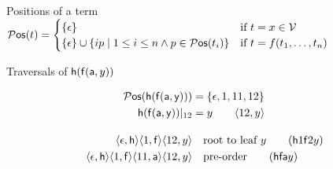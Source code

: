 

\begin{exampleblock}{Positions of a term}
$
	{}{\mathcal P}\mathsf{os}(t) =  
	\begin{cases}
		\{ \epsilon \} & \text{if }t=x\in{\mathcal V} \\
		\{ \epsilon \} \cup \{ ip\mid 1\leq i\leq n \land p\in{}{\mathcal P}\mathsf{os}(t_i)\} &
		\text{if }t=f(t_1,\ldots,t_n)
	\end{cases}
$
\end{exampleblock}

%

\begin{exampleblock}{Traversals of ${\mathsf h}({\mathsf f}({\mathsf a},y))$}
	\vspace{-1em}
\begin{minipage}[c]{3.1cm}
\end{minipage}
%
\begin{minipage}[c]{8.5cm}
\begin{align*}
\Pos(\mh(\mf(\ma,\my))) &= \{ \epsilon, 1, 11, 12 \}
\\
\mh(\mf(\ma,\my))|_{12} &= y \tag*{$\ANGLES{12,y}$}
\\[1em]
\ANGLES{\epsilon,\mh}\ANGLES{1,\mf}\ANGLES{12,y}
&\quad 
\text{root to leaf $y$} 
\tag{$\mh 1 \mf 2 y$}
\\
\ANGLES{\epsilon,\mh}\ANGLES{1,\mf}\ANGLES{11,\ma}\ANGLES{12,y}
&\quad
\text{pre-order} 
\tag{$\mh \mf \ma y$}
\end{align*}
%
\end{minipage}
\end{exampleblock}
